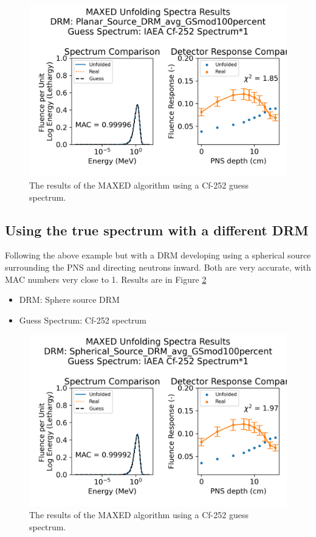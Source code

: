 \begin{figure}[htb]
  \centering
  \includegraphics[scale=0.8]{images/Planar_Source_DRM_avg_GSmod100percent_IAEA Cf-252 Spectrum_0.png}
  \caption{The results of the MAXED algorithm using a Cf-252 guess spectrum.} \label{MAXED_result_PlaneDRM_gs100Cf}
\end{figure}

\subsection*{Using the true spectrum with a different DRM}
Following the above example but with a DRM developing using a spherical source surrounding the PNS and directing neutrons inward. Both are very accurate, with MAC numbers very close to 1. Results are in Figure \ref{MAXED_result_sphereDRM_gs100Cf}
\begin{itemize}
\item DRM: Sphere source DRM
\item Guess Spectrum: Cf-252 spectrum
\end{itemize}

\begin{figure}[htb]
  \centering
  \includegraphics[scale=0.8]{images/Spherical_Source_DRM_avg_GSmod100percent_IAEA Cf-252 Spectrum_0.png}
  \caption{The results of the MAXED algorithm using a Cf-252 guess spectrum.} \label{MAXED_result_sphereDRM_gs100Cf}
\end{figure}

